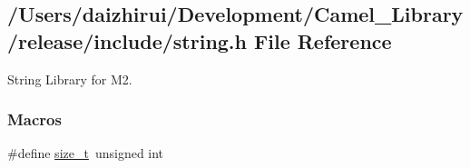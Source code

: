 \hypertarget{a00038}{}\subsection{/\+Users/daizhirui/\+Development/\+Camel\+\_\+\+Library/release/include/string.h File Reference}
\label{a00038}


String Library for M2.  


\subsubsection*{Macros}
\begin{DoxyCompactItemize}
\item 
\#define \mbox{\hyperlink{a00038_a43b4547e12226fef871eed8afe191ad7}{size\+\_\+t}}~unsigned int
\end{DoxyCompactItemize}
